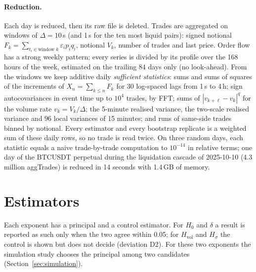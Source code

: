 \documentclass[11pt]{article}
\newcommand{\Hz}{H_0}
\newcommand{\Hv}{H_{\mathrm{vol}}}
\newcommand{\Hs}{H_\sigma}
\begin{document}
\paragraph{Reduction.} Each day is reduced, then its raw file is deleted. Trades are
aggregated on windows of $\Delta=10$\,s (and 1\,s for the ten most liquid pairs): signed
notional $F_k=\sum_{t_i\in\text{window }k}\varepsilon_i p_i q_i$, notional $V_k$, number of
trades and last price. Order flow has a strong weekly pattern; every series is divided by
its profile over the 168 hours of the week, estimated on the trailing 84 days only (no
look-ahead). From the windows we keep additive daily \emph{sufficient statistics}: sums
and sums of squares of the increments of $X_n=\sum_{k\le n}F_k$ for 30 log-spaced lags from
1\,s to 4\,h; sign autocovariances in event time up to $10^4$ trades, by FFT; sums of
$|v_{k+\ell}-v_k|^q$ for the volume rate $v_k=V_k/\Delta$; the 5-minute realised variance,
the two-scale realised variance \citep{zhang2005} and 96 local variances of 15 minutes;
and runs of same-side trades binned by notional. Every estimator and every bootstrap
replicate is a weighted sum of these daily rows, so no trade is read twice. On three random
days, each statistic equals a naive trade-by-trade computation to $10^{-14}$ in relative
terms; one day of the BTCUSDT perpetual during the liquidation cascade of 2025-10-10
(4.3 million aggTrades) is reduced in 14 seconds with 1.4\,GB of memory.

\section{Estimators}
\label{sec:estimators}
Each exponent has a principal and a control estimator. For $\Hz$ and $\delta$ a result is
reported as such only when the two agree within 0.05; for $\Hv$ and $\Hs$ the control is
shown but does not decide (deviation D2). For these two exponents the simulation study
chooses the principal among two candidates (Section~\ref{sec:simulation}).
\end{document}
